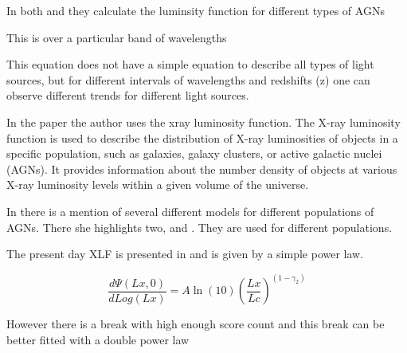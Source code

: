 \documentclass{article}
\begin{document}
In both \cite{Ajello_2009} and \cite{Ueda_2003} they calculate the luminsity function for different types of AGNs



This is over a particular band of wavelengths


This equation does not have a simple equation to describe all types of light sources, but for different intervals of wavelengths and redshifts (z) one can observe different trends for different light sources. 

In the paper \cite{Jacobsen:2015mga} the author uses the xray luminosity function. The X-ray luminosity function is used to describe the distribution of X-ray luminosities of objects in a specific population, such as galaxies, galaxy clusters, or active galactic nuclei (AGNs). It provides information about the number density of objects at various X-ray luminosity levels within a given volume of the universe.


In \cite{Jacobsen:2015mga} there is a mention of several different models for different populations of AGNs. There she highlights two, \cite{Ajello_2009} and \cite{Ueda_2003}. They are used for different populations.

The present day XLF is presented in \cite{Ajello_2009} and is given by a simple power law. 

\begin{equation}
    \frac{d\Psi(Lx,0)}{dLog(Lx)} = A\ln (10){(\frac{Lx}{Lc})}^{(1-\gamma_2)}
\end{equation}

However there is a break with high enough score count and this break can be better fitted with a double power law 
\end{document}
